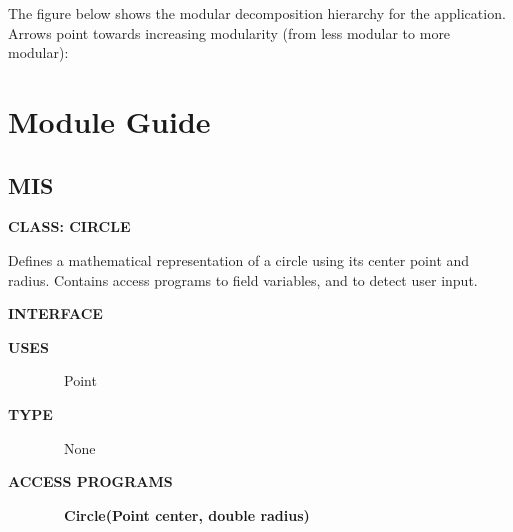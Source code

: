 \documentclass{article}
\begin{document}
\newpage
The figure below shows the modular decomposition hierarchy for the application. Arrows point towards increasing modularity (from less modular to more modular):


\begin{minipage}{\linewidth}
\end{minipage}

\newpage
\section{Module Guide}

\subsection{MIS}

{}

{\textbf{CLASS: CIRCLE}}

{Defines a mathematical representation of a circle using its center
point and radius. Contains access programs to field variables, and to
detect user input.}

{}


{\textbf{INTERFACE}}


{\textbf{USES}}

{~~~~~~~~Point}

{\textbf{TYPE}}

{~~~~~~~~None}

{\textbf{ACCESS PROGRAMS}}

{~~~~~~~~\textbf{Circle(Point center, double radius)}}
\end{document}

